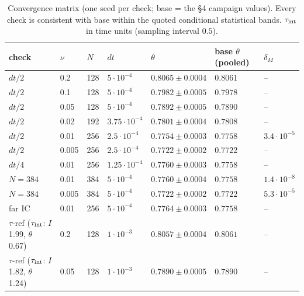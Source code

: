 \documentclass[11pt]{article}
\theoremstyle{remark}
\theoremstyle{plain}
\begin{document}
\begin{table}[htbp]
\centering\small
\caption{Convergence matrix (one seed per check; base = the \S4 campaign values).
Every check is consistent with base within the quoted conditional statistical bands.
$\tau_{\rm int}$ in time units (sampling interval $0.5$).}
\label{tab:convergence}
\begin{tabular}{l l l l l l l}
\hline
check & $\nu$ & $N$ & $dt$ & $\theta$ & base $\theta$ (pooled) & $\delta_M$ \\
\hline
$dt/2$ & 0.2 & 128 & $5\cdot10^{-4}$ & $0.8065\pm0.0004$ & $0.8061$ & -- \\
$dt/2$ & 0.1 & 128 & $5\cdot10^{-4}$ & $0.7982\pm0.0005$ & $0.7978$ & -- \\
$dt/2$ & 0.05 & 128 & $5\cdot10^{-4}$ & $0.7892\pm0.0005$ & $0.7890$ & -- \\
$dt/2$ & 0.02 & 192 & $3.75\cdot10^{-4}$ & $0.7801\pm0.0004$ & $0.7808$ & -- \\
$dt/2$ & 0.01 & 256 & $2.5\cdot10^{-4}$ & $0.7754\pm0.0003$ & $0.7758$ & $3.4\cdot10^{-5}$ \\
$dt/2$ & 0.005 & 256 & $2.5\cdot10^{-4}$ & $0.7722\pm0.0002$ & $0.7722$ & -- \\
$dt/4$ & 0.01 & 256 & $1.25\cdot10^{-4}$ & $0.7760\pm0.0003$ & $0.7758$ & -- \\
$N{=}384$ & 0.01 & 384 & $5\cdot10^{-4}$ & $0.7760\pm0.0004$ & $0.7758$ & $1.4\cdot10^{-8}$ \\
$N{=}384$ & 0.005 & 384 & $5\cdot10^{-4}$ & $0.7722\pm0.0002$ & $0.7722$ & $5.3\cdot10^{-5}$ \\
far IC & 0.01 & 256 & $5\cdot10^{-4}$ & $0.7764\pm0.0003$ & $0.7758$ & -- \\
$\tau$-ref ($\tau_{\rm int}$: $I$ 1.99, $\theta$ 0.67) & 0.2 & 128 & $1\cdot10^{-3}$ & $0.8057\pm0.0004$ & $0.8061$ & -- \\
$\tau$-ref ($\tau_{\rm int}$: $I$ 1.82, $\theta$ 1.24) & 0.05 & 128 & $1\cdot10^{-3}$ & $0.7890\pm0.0005$ & $0.7890$ & -- \\
\hline
\end{tabular}
\end{table}
\end{document}
